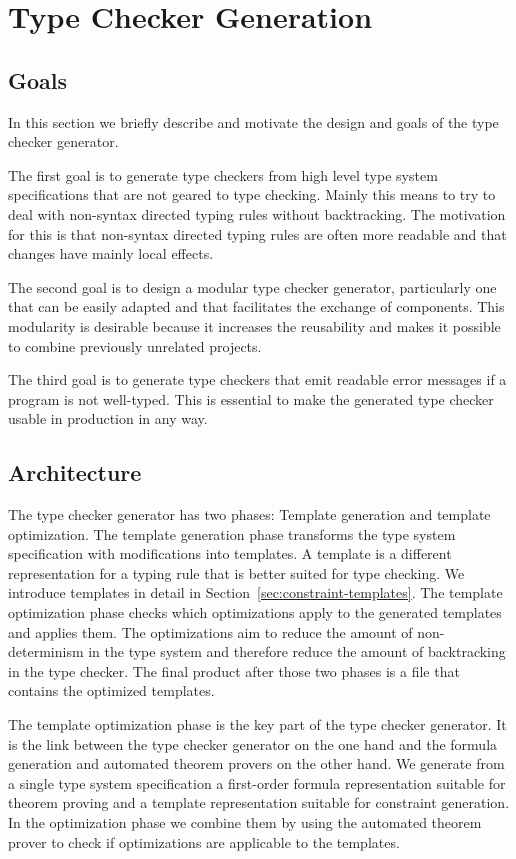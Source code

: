 \chapter{Type Checker Generation}
\section{Goals}
In this section we briefly describe and motivate the design and goals
of the type checker generator.

The first goal is to generate type checkers from high level type
system specifications that are not geared to type checking. Mainly
this means to try to deal with non-syntax directed typing rules
without backtracking. The motivation for this is that non-syntax
directed typing rules are often more readable and that changes have
mainly local effects. 

The second goal is to design a modular type checker generator,
particularly one that can be easily adapted and that facilitates the
exchange of components. This modularity is desirable because it
increases the reusability and makes it possible to combine previously
unrelated projects.

The third goal is to generate type checkers that emit readable error
messages if a program is not well-typed. This is essential to make the
generated type checker usable in production in any way.
\section{Architecture}
The type checker generator has two phases: Template generation and
template optimization. The template generation phase transforms the
type system specification with modifications into templates. A
template is a different representation for a typing rule that is
better suited for type checking. We introduce templates in detail in
Section~\ref{sec:constraint-templates}. The template optimization
phase checks which optimizations apply to the generated templates and
applies them. The optimizations aim to reduce the amount of
non-determinism in the type system and therefore reduce the amount of
backtracking in the type checker. The final product after those two
phases is a file that contains the optimized templates.

The template optimization phase is the key part of the type checker
generator. It is the link between the type checker generator on the
one hand and the formula generation and automated theorem provers on
the other hand. We generate from a single type system specification a
first-order formula representation suitable for theorem proving and a
template representation suitable for constraint generation. In the
optimization phase we combine them by using the automated theorem
prover to check if optimizations are applicable to the templates.

